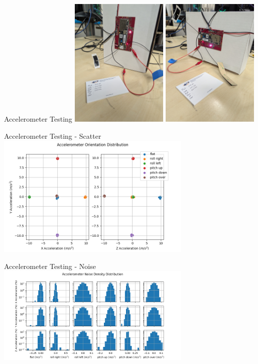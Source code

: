 \begin{frame}{Accelerometer Testing}
    \centering
    \includegraphics[height=0.7\textheight,width=0.35\textwidth,keepaspectratio]{images/sf_setup_pitch_up.jpg}
    \includegraphics[height=0.7\textheight,width=0.35\textwidth,keepaspectratio]{images/sf_setup_roll_left.jpg}
\end{frame}
\begin{frame}{Accelerometer Testing - Scatter}
    \centering
    \includegraphics[height=0.7\textheight,width=0.7\textwidth,keepaspectratio]{images/sf_accelerometer_distribution.png}
\end{frame}
\begin{frame}{Accelerometer Testing - Noise}
    \centering
    \includegraphics[height=0.7\textheight,width=0.7\textwidth,keepaspectratio]{images/sf_accelerometer_noise_density_distribution.png}
\end{frame}



